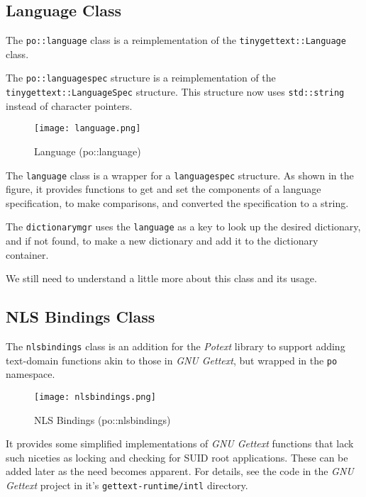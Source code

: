 \subsection{Language Class}
\label{subsec:potext_language_class}

   The \texttt{po::language} class is a reimplementation of the
   \texttt{tinygettext::Language} class.

   The \texttt{po::languagespec} structure is a reimplementation of the
   \texttt{tinygettext::LanguageSpec} structure.
   This structure now uses \texttt{std::string} instead of character pointers.

\begin{figure}[H]
   \centering 
   \texttt{[image: language.png]}
   \caption{Language (po::language)}
   \label{fig:potext_language}
\end{figure}

   The \texttt{language} class is a wrapper for a
   \texttt{languagespec} structure.
   As shown in the figure, it provides functions to get and set the
   components of a language specification, to make comparisons, and
   converted the specification to a string.

   The \texttt{dictionarymgr} uses the
   \texttt{language} as a key to look up the desired dictionary, and
   if not found, to make a new dictionary and add it to the dictionary
   container.

   We still need to understand a little more about this class and its usage.

\subsection{NLS Bindings Class}
\label{subsec:potext_nlsbindings_class}

   The \texttt{nlsbindings} class is an addition for the \textsl{Potext}
   library to support adding text-domain functions akin to those in
   \textsl{GNU Gettext}, but wrapped in the \texttt{po} namespace.

\begin{figure}[H]
   \centering 
   \texttt{[image: nlsbindings.png]}
   \caption{NLS Bindings (po::nlsbindings)}
   \label{fig:nlsbindings}
\end{figure}

   It provides some simplified implementations of
   \textsl{GNU Gettext} functions that lack such niceties as
   locking and checking for SUID root applications.
   These can be added later as the need becomes apparent.
   For details, see the code in the 
   \textsl{GNU Gettext} project in it's
   \texttt{gettext-runtime/intl} directory.

